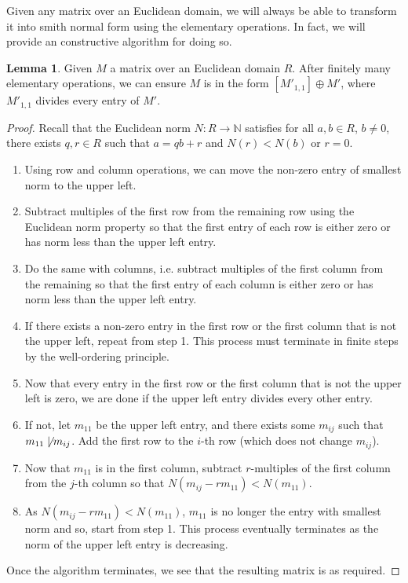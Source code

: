 \documentclass[]{article}
\theoremstyle{definition}
\theoremstyle{definition}
\newtheorem{lemma}{Lemma}[section]
\begin{document}
Given any matrix over an Euclidean domain, we will always be able to transform 
it into smith normal form using the elementary operations. In fact, we will 
provide an constructive algorithm for doing so.

\begin{lemma}
  Given \(M\) a matrix over an Euclidean domain \(R\). After finitely many 
  elementary operations, we can ensure \(M\) is in the form 
  \([M'_{1,1}] \oplus M'\), where \(M'_{1,1}\) divides every entry of \(M'\).
\end{lemma}
\begin{proof}
  Recall that the Euclidean norm \(N : R \to \mathbb{N}\) satisfies for all 
  \(a, b \in R\), \(b \neq 0\), there exists \(q, r \in R\) such that 
  \(a = qb + r\) and \(N(r) < N(b)\) or \(r = 0\).
  \begin{enumerate}
    \item Using row and column operations, we can move the non-zero entry 
      of smallest norm to the upper left.
    \item Subtract multiples of the first row from the remaining row using 
      the Euclidean norm property so that the first entry of each row is either 
      zero or has norm less than the upper left entry.
    \item Do the same with columns, i.e. subtract multiples of the first column 
      from the remaining so that the first entry of each column is either zero 
      or has norm less than the upper left entry.
    \item If there exists a non-zero entry in the first row or the first column 
      that is not the upper left, repeat from step 1.
      This process must terminate in finite steps by the well-ordering 
      principle.
    \item Now that every entry in the first row or the first column 
      that is not the upper left is zero, we are done if the upper left entry 
      divides every other entry.
    \item If not, let \(m_{11}\) be the upper left entry, and there exists some 
      \(m_{ij}\) such that \(m_{11} \not\mid m_{ij}\). Add the first row 
      to the \(i\)-th row (which does not change \(m_{ij}\)). 
    \item Now that \(m_{11}\) is in the first column, subtract \(r\)-multiples of 
      the first column from the \(j\)-th column so that \(N(m_{ij} - rm_{11}) < 
      N(m_{11})\).
    \item As \(N(m_{ij} - rm_{11}) < N(m_{11})\), \(m_{11}\) is no longer the 
      entry with smallest norm and so, start from step 1. This process 
      eventually terminates as the norm of the upper left entry is decreasing.
  \end{enumerate}
  Once the algorithm terminates, we see that the resulting matrix is as 
  required.
\end{proof}
\end{document}
